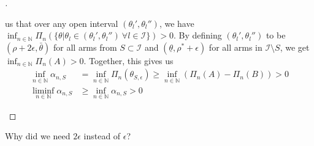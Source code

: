\begin{proof}[]
\begin{itemize}
  us that over any open interval $(\theta_l', \theta_l'')$, we have $\inf_{n \in
  \mathbb{N}} \Pi_n(\{\theta| \theta_l \in (\theta_l', \theta_l'')\ \forall l
  \in \mathcal{I}\}) > 0$. By defining $(\theta_l', \theta_l'')$ to be $(\rho +
  2 \epsilon, \bar{\theta})$ for all arms from $S \subset \mathcal{I}$ and
  $(\underline{\theta}, \rho^* + \epsilon)$ for all arms in $\mathcal{I}
  \setminus S$, we get $\inf_{n \in \mathbb{N}} \Pi_n(A) > 0$. Together, this
  gives us
  \begin{align}
    \inf_{n \in \mathbb{N}} \alpha_{n, S} &= \inf_{n \in \mathbb{N}}
        \Pi_n(\theta_{S, \epsilon}) \geq \inf_{n \in \mathbb{N}}(\Pi_n(A) -
        \Pi_n(B)) > 0 \\
    \liminf_{n \in \mathbb{N}} \alpha_{n, S} &\geq \inf_{n \in \mathbb{N}}
        \alpha_{n, S} > 0
  \end{align}
  \end{itemize}
\end{proof}

\begin{remark}[Kevin 19/09/05]
  Why did we need $2\epsilon$ instead of $\epsilon$?
\end{remark}

